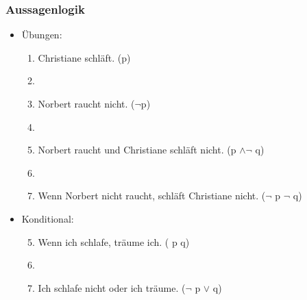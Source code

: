 \begin{frame}
\frametitle{Aussagenlogik}
	
\begin{itemize}
	\item Übungen:

\vspace{1em}

	\begin{enumerate}
		\item Christiane schläft. (p)
		\item[]
		\item Norbert raucht nicht. ($\lnot$p)
		\item[]
		\item Norbert raucht und Christiane schläft nicht. (p $\land \lnot$ q)
		\item[]
		\item Wenn Norbert nicht raucht, schläft Christiane nicht. ($\lnot$ p \ras $\lnot$ q)
	\end{enumerate}

\item Konditional:

	\begin{enumerate}\setcounter{enumi}{4}
		\item Wenn ich schlafe, träume ich. ( p \ras q)
		\item[]
		\item Ich schlafe nicht oder ich träume. ($\lnot$ p $\lor$ q)
	\end{enumerate}
	
\end{itemize}

\end{frame}



